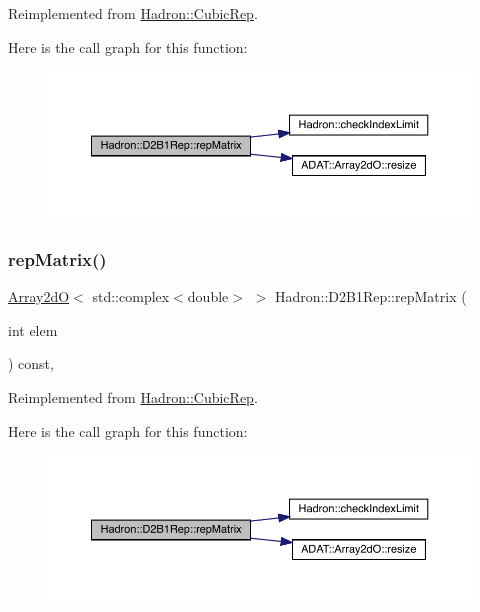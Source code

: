 Reimplemented from \mbox{\hyperlink{structHadron_1_1CubicRep_ac5d7e9e6f4ab1158b5fce3e4ad9e8005}{Hadron\+::\+Cubic\+Rep}}.

Here is the call graph for this function\+:
\nopagebreak
\begin{figure}[H]
\begin{center}
\leavevmode
\includegraphics[width=350pt]{d1/d67/structHadron_1_1D2B1Rep_a3d7f68800d29238030406bf06553360f_cgraph}
\end{center}
\end{figure}
\mbox{\label{structHadron_1_1D2B1Rep_a3d7f68800d29238030406bf06553360f}} 
\subsubsection{\texorpdfstring{repMatrix()}{repMatrix()}\hspace{0.1cm}{\footnotesize\ttfamily [3/3]}}
{\footnotesize\ttfamily \mbox{\hyperlink{classADAT_1_1Array2dO}{Array2dO}}$<$ std\+::complex$<$double$>$ $>$ Hadron\+::\+D2\+B1\+Rep\+::rep\+Matrix (\begin{DoxyParamCaption}\item[{int}]{elem }\end{DoxyParamCaption}) const\hspace{0.3cm}{\ttfamily [inline]}, {\ttfamily [virtual]}}



Reimplemented from \mbox{\hyperlink{structHadron_1_1CubicRep_ac5d7e9e6f4ab1158b5fce3e4ad9e8005}{Hadron\+::\+Cubic\+Rep}}.

Here is the call graph for this function\+:
\nopagebreak
\begin{figure}[H]
\begin{center}
\leavevmode
\includegraphics[width=350pt]{d1/d67/structHadron_1_1D2B1Rep_a3d7f68800d29238030406bf06553360f_cgraph}
\end{center}
\end{figure}


